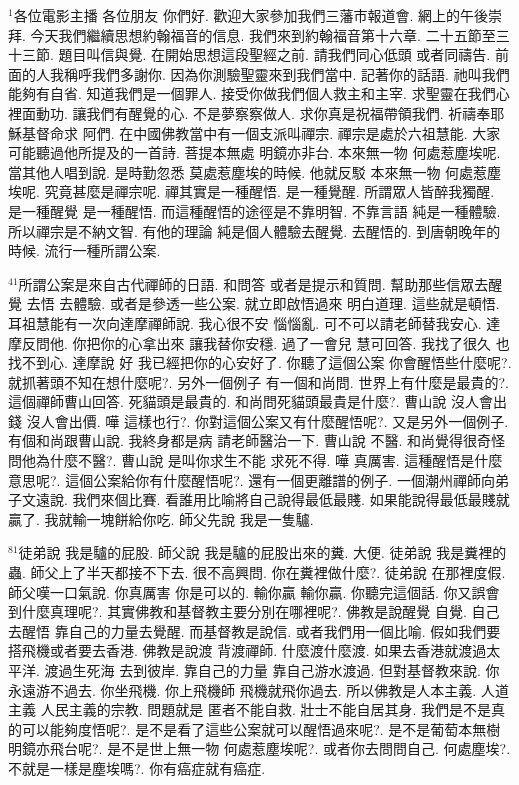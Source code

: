 \documentclass{book}
\begin{document}
$^{1}$各位電影主播 各位朋友 你們好.
歡迎大家參加我們三藩市報道會.
網上的午後崇拜.
今天我們繼續思想約翰福音的信息.
我們來到約翰福音第十六章.
二十五節至三十三節.
題目叫信與覺.
在開始思想這段聖經之前.
請我們同心低頭 或者同禱告.
前面的人我稱呼我們多謝你.
因為你測驗聖靈來到我們當中.
記著你的話語.
祂叫我們能夠有自省.
知道我們是一個罪人.
接受你做我們個人救主和主宰.
求聖靈在我們心裡面動功.
讓我們有醒覺的心.
不是夢察察做人.
求你真是祝福帶領我們.
祈禱奉耶穌基督命求 阿們.
在中國佛教當中有一個支派叫禪宗.
禪宗是處於六祖慧能.
大家可能聽過他所提及的一首詩.
菩提本無處 明鏡亦非台.
本來無一物 何處惹塵埃呢.
當其他人唱到說.
是時勤忽悉 莫處惹塵埃的時候.
他就反駁 本來無一物 何處惹塵埃呢.
究竟甚麼是禪宗呢.
禪其實是一種醒悟.
是一種覺醒.
所謂眾人皆醉我獨醒.
是一種醒覺 是一種醒悟.
而這種醒悟的途徑是不靠明智.
不靠言語 純是一種體驗.
所以禪宗是不納文智.
有他的理論 純是個人體驗去醒覺.
去醒悟的.
到唐朝晚年的時候.
流行一種所謂公案.

$^{41}$所謂公案是來自古代禪師的日語.
和問答 或者是提示和質問.
幫助那些信眾去醒覺 去悟 去體驗.
或者是參透一些公案.
就立即啟悟過來 明白道理.
這些就是頓悟.
耳祖慧能有一次向達摩禪師說.
我心很不安 惱惱亂.
可不可以請老師替我安心.
達摩反問他.
你把你的心拿出來 讓我替你安穩.
過了一會兒 慧可回答.
我找了很久 也找不到心.
達摩說 好 我已經把你的心安好了.
你聽了這個公案 你會醒悟些什麼呢?.
就抓著頭不知在想什麼呢?.
另外一個例子 有一個和尚問.
世界上有什麼是最貴的?.
這個禪師曹山回答.
死貓頭是最貴的.
和尚問死貓頭最貴是什麼?.
曹山說 沒人會出錢 沒人會出價.
嘩 這樣也行?.
你對這個公案又有什麼醒悟呢?.
又是另外一個例子.
有個和尚跟曹山說.
我終身都是病 請老師醫治一下.
曹山說 不醫.
和尚覺得很奇怪 問他為什麼不醫?.
曹山說 是叫你求生不能 求死不得.
嘩 真厲害.
這種醒悟是什麼意思呢?.
這個公案給你有什麼醒悟呢?.
還有一個更離譜的例子.
一個潮州禪師向弟子文遠說.
我們來個比賽.
看誰用比喻將自己說得最低最賤.
如果能說得最低最賤就贏了.
我就輸一塊餅給你吃.
師父先說 我是一隻驢.

$^{81}$徒弟說 我是驢的屁股.
師父說 我是驢的屁股出來的糞.
大便.
徒弟說 我是糞裡的蟲.
師父上了半天都接不下去.
很不高興問.
你在糞裡做什麼?.
徒弟說 在那裡度假.
師父嘆一口氣說.
你真厲害 你是可以的.
輸你贏 輸你贏.
你聽完這個話.
你又誤會到什麼真理呢?.
其實佛教和基督教主要分別在哪裡呢?.
佛教是說醒覺 自覺.
自己去醒悟 靠自己的力量去覺醒.
而基督教是說信.
或者我們用一個比喻.
假如我們要搭飛機或者要去香港.
佛教是說渡 背渡禪師.
什麼渡什麼渡.
如果去香港就渡過太平洋.
渡過生死海 去到彼岸.
靠自己的力量 靠自己游水渡過.
但對基督教來說.
你永遠游不過去.
你坐飛機.
你上飛機師 飛機就飛你過去.
所以佛教是人本主義.
人道主義 人民主義的宗教.
問題就是 匿者不能自救.
壯士不能自居其身.
我們是不是真的可以能夠度悟呢?.
是不是看了這些公案就可以醒悟過來呢?.
是不是葡萄本無樹 明鏡亦飛台呢?.
是不是世上無一物 何處惹塵埃呢?.
或者你去問問自己.
何處塵埃?.
不就是一樣是塵埃嗎?.
你有癌症就有癌症.
\end{document}
